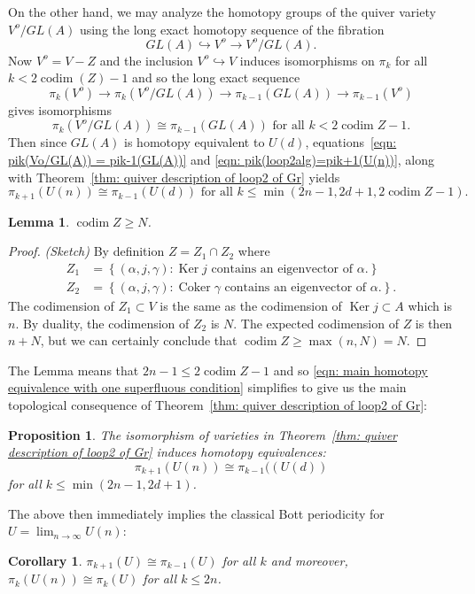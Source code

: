 \documentclass{amsart}
\newtheorem{proposition}[theorem]{Proposition}
\newtheorem{lemma}[theorem]{Lemma}
\newtheorem{corollary}[theorem]{Corollary}
\theoremstyle{definition}
\newcommand{\Ker}{\operatorname{Ker}}
\newcommand{\Coker}{\operatorname{Coker}}
\newcommand{\codim}{\operatorname{codim}}
\begin{document}
On the other hand, we may analyze the homotopy groups of the quiver
variety $V^{o}/GL(A)$ using the long exact homotopy sequence of the
fibration
\[
GL(A)\hookrightarrow V^{o} \to V^{o}/GL(A). 
\]
Now $V^{o} = V-Z$ and the inclusion $V^{o} \hookrightarrow V$ induces
isomorphisms on $\pi_{k}$ for all $k< 2\codim(Z)-1$
\cite[Prop~7.1]{Anderson-Fulton} and so the long exact sequence
\[
\pi_{k}(V^{o})\to \pi_{k}(V^{o}/GL(A)) \to \pi_{k-1}(GL(A)) \to \pi_{k-1}(V^{o})
\]
gives isomorphisms
\begin{equation}\label{eqn: pik(Vo/GL(A)) = pik-1(GL(A))}
\pi_{k}(V^{o}/GL(A))\cong \pi_{k-1}(GL(A)) \text{  for all $k<2\codim Z
-1$}.
\end{equation}
Then since $GL(A)$ is homotopy equivalent to $U(d)$,
equations~\eqref{eqn: pik(Vo/GL(A)) = pik-1(GL(A))} and \eqref{eqn:
pik(loop2alg)=pik+1(U(n))}, along with Theorem~\ref{thm: quiver
description of loop2 of Gr} yields
\begin{equation}\label{eqn: main homotopy equivalence with one
superfluous condition}
\pi_{k+1}(U(n))\cong \pi_{k-1}(U(d))\text{   for all   } k\leq \min
(2n-1,2d+1, 2\codim Z - 1).
\end{equation}

\begin{lemma}
$\codim Z \geq N$. 
\end{lemma}
\begin{proof}
\emph{(Sketch)} By definition $Z=Z_{1}\cap Z_{2} $ where
\begin{align*}
Z_{1}&= \left\{(\alpha ,j,\gamma ): \text{$\Ker j$ contains an
eigenvector of $\alpha$}.  \right\}\\
Z_{2}&= \left\{(\alpha ,j,\gamma ): \text{$\Coker \gamma  $ contains an
eigenvector of $\alpha$}.  \right\}.
\end{align*}
The codimension of $Z_{1}\subset V$ is the same as the codimension of
$\Ker j \subset A$ which is $n$. By duality, the codimension of
$Z_{2}$ is $N$. The expected codimension of $Z$ is then $n+N$, but we
can certainly conclude that $\codim Z\geq \max (n,N)=N$.
\end{proof}
The Lemma means that $2n-1\leq 2\codim Z-1$ and so \eqref{eqn: main
homotopy equivalence with one superfluous condition} simplifies to
give us the main topological consequence of Theorem~\ref{thm: quiver
description of loop2 of Gr}: 
\begin{proposition}\label{prop: main homotopy equivalence}
The isomorphism of varieties in Theorem~\ref{thm: quiver description
of loop2 of Gr} induces homotopy equivalences:
\[
\pi_{k+1}(U(n))\cong \pi_{k-1}((U(d))
\]
for all $k\leq \min (2n-1,2d+1)$.
\end{proposition}
The above then immediately implies the classical Bott periodicity for
$U=\lim_{n\to \infty}U(n)$:
\begin{corollary}
$\pi_{k+1}(U)\cong \pi_{k-1}(U)$ for all $k$ and moreover,
$\pi_{k}(U(n))\cong \pi_{k}(U) $ for all $k\leq 2n$.
\end{corollary}






\end{document}
